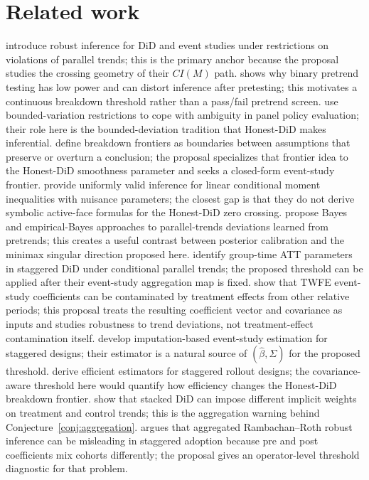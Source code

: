 \documentclass[11pt]{article}
\theoremstyle{definition}
\theoremstyle{plain}
\theoremstyle{remark}
\begin{document}
\section{Related work}
\citet{rambachan2023parallel} introduce robust inference for DiD and event studies under restrictions on violations of parallel trends; this is the primary anchor because the proposal studies the crossing geometry of their \(CI(M)\) path.
\citet{roth2022pretest} shows why binary pretrend testing has low power and can distort inference after pretesting; this motivates a continuous breakdown threshold rather than a pass/fail pretrend screen.
\citet{manski2018bounded} use bounded-variation restrictions to cope with ambiguity in panel policy evaluation; their role here is the bounded-deviation tradition that Honest-DiD makes inferential.
\citet{masten2020breakdown} define breakdown frontiers as boundaries between assumptions that preserve or overturn a conclusion; the proposal specializes that frontier idea to the Honest-DiD smoothness parameter and seeks a closed-form event-study frontier.
\citet{andrews2023linear} provide uniformly valid inference for linear conditional moment inequalities with nuisance parameters; the closest gap is that they do not derive symbolic active-face formulas for the Honest-DiD zero crossing.
\citet{kwon2024bayes} propose Bayes and empirical-Bayes approaches to parallel-trends deviations learned from pretrends; this creates a useful contrast between posterior calibration and the minimax singular direction proposed here.
\citet{callaway2021multiple} identify group-time ATT parameters in staggered DiD under conditional parallel trends; the proposed threshold can be applied after their event-study aggregation map is fixed.
\citet{sunabraham2021eventstudy} show that TWFE event-study coefficients can be contaminated by treatment effects from other relative periods; this proposal treats the resulting coefficient vector and covariance as inputs and studies robustness to trend deviations, not treatment-effect contamination itself.
\citet{borusyak2024eventstudy} develop imputation-based event-study estimation for staggered designs; their estimator is a natural source of \((\widehat\beta,\Sigma)\) for the proposed threshold.
\citet{rothsantanna2023efficient} derive efficient estimators for staggered rollout designs; the covariance-aware threshold here would quantify how efficiency changes the Honest-DiD breakdown frontier.
\citet{wing2024stacked} show that stacked DiD can impose different implicit weights on treatment and control trends; this is the aggregation warning behind Conjecture~\ref{conj:aggregation}.
\citet{liu2025cohort} argues that aggregated Rambachan--Roth robust inference can be misleading in staggered adoption because pre and post coefficients mix cohorts differently; the proposal gives an operator-level threshold diagnostic for that problem.
\end{document}
